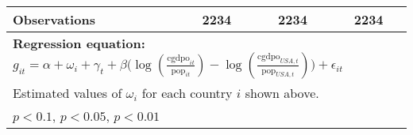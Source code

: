 \begin{table}[htbp]
\begin{tabular}{l*{3}{c}}
\midrule
Observations    &     2234         &     2234         &     2234         \\
\bottomrule
\multicolumn{4}{l}{\footnotesize \textbf{Regression equation:} \(g_{it} = \alpha  + \omega_i + \gamma_t + \beta \big(\log (\frac{\textrm{cgdpo}_{it}}{\textrm{pop}_{it}} ) - \log (\frac{\textrm{cgdpo}_{USA,t}}{\textrm{pop}_{USA,t}}  ) \big) + \epsilon_{it}\)}\\
\multicolumn{4}{l}{\footnotesize Estimated values of \(\omega_i\) for each country \(i\) shown above.}\\
\multicolumn{4}{l}{\footnotesize \sym{*} \(p<0.1\), \sym{**} \(p<0.05\), \sym{***} \(p<0.01\)}\\
\end{tabular}
\end{table}
